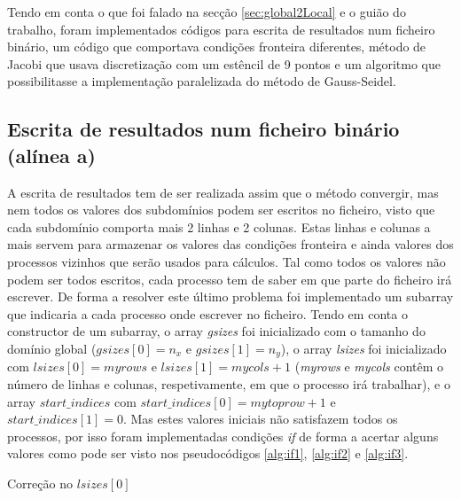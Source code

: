 \documentclass[10pt]{extarticle}
\begin{document}
Tendo em conta o que foi falado na secção \ref{sec:global2Local} e o guião do trabalho, foram implementados códigos para escrita de resultados num ficheiro binário, um código que comportava condições fronteira diferentes, método de Jacobi que usava discretização com um estêncil de 9 pontos e um algoritmo que possibilitasse a implementação paralelizada do método de Gauss-Seidel.

\subsection{Escrita de resultados num ficheiro binário (alínea a)} \label{subsec:alineA}

A escrita de resultados tem de ser realizada assim que o método convergir, mas  nem todos os valores dos subdomínios podem ser escritos no ficheiro, visto que cada subdomínio comporta mais 2 linhas e 2 colunas. Estas linhas e colunas a mais servem para armazenar os valores das condições fronteira e ainda valores dos processos vizinhos que serão usados para cálculos. Tal como todos os valores não podem ser todos escritos, cada processo tem de saber em que parte do ficheiro irá escrever. De forma a resolver este último problema foi implementado um subarray que indicaria a cada processo onde escrever no ficheiro. Tendo em conta o constructor de um subarray, o array \textit{gsizes} foi inicializado com o tamanho do domínio global (\textit{$gsizes[0]=n_x$} e \textit{$gsizes[1]=n_y$}), o array \textit{lsizes} foi inicializado com  \textit{$lsizes[0]=myrows$} e \textit{$lsizes[1]=mycols+1$} (\textit{myrows} e \textit{mycols} contêm o número de linhas e colunas, respetivamente, em que o processo irá trabalhar), e o array \textit{$start\_indices$} com \textit{$start\_indices[0]= mytoprow+1$} e \textit{$start\_indices[1]=0$}. Mas estes valores iniciais não satisfazem todos os processos, por isso foram implementadas condições \textit{if} de forma a acertar alguns valores como pode ser visto nos pseudocódigos \ref{alg:if1}, \ref{alg:if2} e \ref{alg:if3}.
\linebreak
\linebreak
 \begin{algorithm}[H]
 
 \caption{Correção no \textit{$lsizes[0]$}}
 \label{alg:if1}
 \end{algorithm}
 
\end{document}
